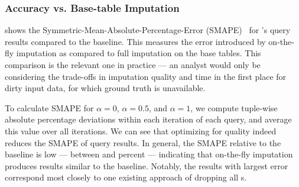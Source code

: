 

\subsubsection{Accuracy vs. Base-table Imputation}

 shows the Symmetric-Mean-Absolute-Percentage-Error (SMAPE)~\cite{Makridakis2000451} for \ProjectName{}'s query results compared to the baseline.
This measures the error introduced by on-the-fly imputation as compared to full imputation on the base tables.
This comparison is the relevant one in practice --- an analyst would only be considering the trade-offs in imputation quality and time in the first place for dirty input data, for which ground truth is unavailable.

To calculate SMAPE for $\alpha=0$, $\alpha=0.5$, and $\alpha=1$, 
we compute tuple-wise absolute percentage deviations within each iteration of each query, and
average this value over all iterations. We
can see that optimizing for quality indeed reduces the SMAPE of query results.  In general, the SMAPE relative 
to the baseline is low --- between \lowsmapealphazero{} and
\highsmapealphaoneexacs{} percent --- indicating that on-the-fly imputation produces results similar to the baseline. Notably, the results with largest error correspond
most closely to one existing approach of dropping all \nullv{}s.

